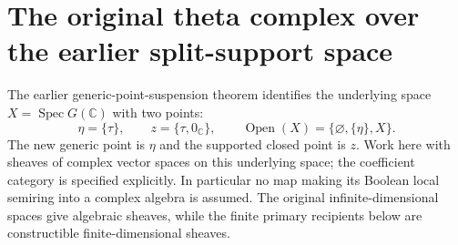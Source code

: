 \documentclass[11pt]{article}
\newcommand{\C}{\mathbb C}\newcommand{\R}{\mathbb R}
\begin{document}
\section{The original theta complex over the earlier split-support space}
The earlier generic-point-suspension theorem identifies the underlying
space $X=\operatorname{Spec}G(\C)$ with two points:
\[
 \eta=\{\tau\},\qquad z=\{\tau,0_\C\},\qquad
 \operatorname{Open}(X)=\{\varnothing,\{\eta\},X\}.
\]
The new generic point is $\eta$ and the supported closed point is $z$.
Work here with sheaves of complex vector spaces on this underlying
space; the coefficient category is specified explicitly. In particular
no map making its Boolean local semiring into a complex algebra is
assumed. The original infinite-dimensional spaces give algebraic
sheaves, while the finite primary recipients below are constructible
finite-dimensional sheaves.
\end{document}
